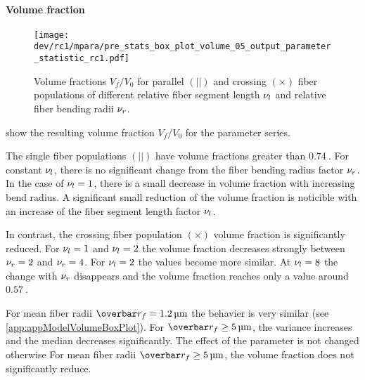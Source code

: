 \paragraph{Volume fraction}
%
\begin{figure}[t]
\centering
\texttt{[image: dev/rc1/mpara/pre\_stats\_box\_plot\_volume\_05\_output\_parameter\_statistic\_rc1.pdf]}
\caption{Volume fractions $V_f/V_0$ for parallel $(||)$ and crossing $(\times)$ fiber populations of different relative fiber segment length $\textnormal{$\nu_{l}$}$ and relative fiber bending radii $\textnormal{$\nu_{r}$}$.}
\label{fig:psbp1}
\end{figure}
 show the resulting volume fraction $V_f/V_0$ for the parameter series.
\par
%
The single fiber populations $(||)$ have volume fractions greater than $\SI{0.74}{}$.
For constant $\textnormal{$\nu_{l}$}$, there is no significant change from the fiber bending radius factor $\textnormal{$\nu_{r}$}$.
In the case of $\textnormal{$\nu_{l}$} = \SI{1}{}$, there is a small decrease in volume fraction with increasing bend radius.
A significant small reduction of the volume fraction is noticible with an increase of the fiber segment length factor $\textnormal{$\nu_{l}$}$.
\par
%
In contrast, the crossing fiber population $(\times)$ volume fraction is significantly reduced.
For $\textnormal{$\nu_{l}$}=\SI{1}{}$ and $\textnormal{$\nu_{l}$}=\SI{2}{}$ the volume fraction decreases strongly between $\textnormal{$\nu_{r}$} = \SI{2}{}$ and $\textnormal{$\nu_{r}$} = \SI{4}{}$.
For $\textnormal{$\nu_{l}$}=\SI{2}{}$ the values become more similar.
At $\textnormal{$\nu_{l}$}=\SI{8}{}$ the change with $\textnormal{$\nu_{r}$}$ disappears and the volume fraction reaches only a value around $\SI{0.57}{}$.
\par
%
For mean fiber radii $\fiberRadiusMean = \SIlist{1,2}{\micro\meter}$ the behavier is very similar (see \cref{app:appModelVolumeBoxPlot}). For $\fiberRadiusMean \geq \SI{5}{\micro\meter}$, the variance increases and the median decreases significantly.
The effect of the parameter is not changed otherwise
For mean fiber radii $\fiberRadiusMean \geq \SI{5}{\micro\meter}$, the volume fraction does not significantly reduce.
% 
% 
% 
